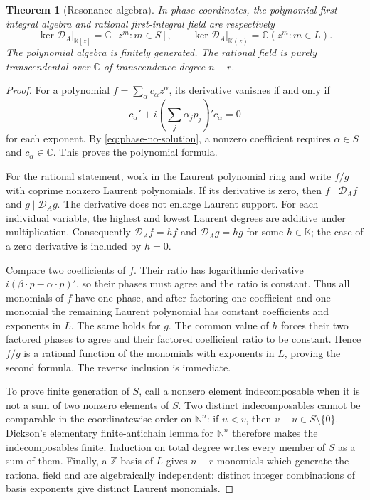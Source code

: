 \documentclass[11pt,a4paper]{article}
\numberwithin{equation}{section}
\newtheorem{theorem}{Theorem}[section]
\theoremstyle{definition}
\theoremstyle{remark}
\newcommand{\K}{\mathbb K}
\newcommand{\C}{\mathbb C}
\newcommand{\N}{\mathbb N}
\newcommand{\Z}{\mathbb Z}
\begin{document}
\begin{theorem}[Resonance algebra]\label{thm:invariants}
In phase coordinates, the polynomial first-integral algebra and rational
first-integral field are respectively
\begin{equation}\label{eq:invariantring}
 \ker\mathcal D_A\big|_{\K[z]}=\C[z^m:m\in S],
 \qquad
 \ker\mathcal D_A\big|_{\K(z)}=\C(z^m:m\in L).
\end{equation}
The polynomial algebra is finitely generated. The rational field is purely
transcendental over $\C$ of transcendence degree $n-r$.
\end{theorem}
\begin{proof}
For a polynomial $f=\sum_\alpha c_\alpha z^\alpha$, its derivative vanishes
if and only if
\[
 c_\alpha'+i\left(\sum_j\alpha_jp_j\right)'c_\alpha=0
\]
for each exponent. By \eqref{eq:phase-no-solution}, a nonzero coefficient
requires $\alpha\in S$ and $c_\alpha\in\C$. This proves the polynomial
formula.

For the rational statement, work in the Laurent polynomial ring and write
$f/g$ with coprime nonzero Laurent polynomials. If its derivative is zero,
then $f\mid\mathcal D_A f$ and $g\mid\mathcal D_A g$. The derivative does
not enlarge Laurent support. For each individual variable, the highest
and lowest Laurent degrees are additive under multiplication. Consequently
$\mathcal D_A f=hf$ and $\mathcal D_A g=hg$ for some $h\in\K$; the case
of a zero derivative is included by $h=0$.

Compare two coefficients of $f$. Their ratio has logarithmic derivative
$i(\beta\cdot p-\alpha\cdot p)'$, so their phases must agree and the
ratio is constant. Thus all monomials of $f$ have one phase, and after
factoring one coefficient and one monomial the remaining Laurent polynomial
has constant coefficients and exponents in $L$. The same holds for $g$.
The common value of $h$ forces their two factored phases to agree and their
factored coefficient ratio to be constant. Hence $f/g$ is a rational
function of the monomials with exponents in $L$, proving the second
formula. The reverse inclusion is immediate.

To prove finite generation of $S$, call a nonzero element indecomposable
when it is not a sum of two nonzero elements of $S$. Two distinct
indecomposables cannot be comparable in the coordinatewise order on
$\N^n$: if $u<v$, then $v-u\in S\setminus\{0\}$. Dickson's elementary
finite-antichain lemma for $\N^n$ therefore makes the indecomposables
finite. Induction on total degree writes every member of $S$ as a sum of
them. Finally, a $\Z$-basis of $L$ gives $n-r$ monomials which generate
the rational field and are algebraically independent: distinct integer
combinations of basis exponents give distinct Laurent monomials.
\end{proof}
\end{document}
